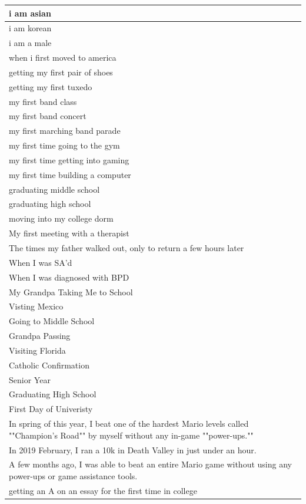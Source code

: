 \documentclass[
  .7em,
  letterpaper,
  DIV=11,
  numbers=noendperiod]{scrartcl}
\begin{document}
\begin{table}
\begin{tabular}{l}
i am asian\\
\hline
i am korean\\
\hline
i am a male\\
\hline
when i first moved to america\\
\hline
getting my first pair of shoes\\
\hline
getting my first tuxedo\\
\hline
my first band class\\
\hline
my first band concert\\
\hline
my first marching band parade\\
\hline
my first time going to the gym\\
\hline
my first time getting into gaming\\
\hline
my first time building a computer\\
\hline
graduating middle school\\
\hline
graduating high school\\
\hline
moving into my college dorm\\
\hline
My first meeting with a therapist\\
\hline
The times my father walked out, only to return a few hours later\\
\hline
When I was SA'd\\
\hline
When I was diagnosed with BPD\\
\hline
My Grandpa Taking Me to School\\
\hline
Visting Mexico\\
\hline
Going to Middle School\\
\hline
Grandpa Passing\\
\hline
Visiting Florida\\
\hline
Catholic Confirmation\\
\hline
Senior Year\\
\hline
Graduating High School\\
\hline
First Day of Univeristy\\
\hline
In spring of this year, I beat one of the hardest Mario levels called ""Champion's Road"" by myself without any in-game ""power-ups.""\\
\hline
In 2019 February, I ran a 10k in Death Valley in just under an hour.\\
\hline
A few months ago, I was able to beat an entire Mario game without using any power-ups or game assistance tools.\\
\hline
getting an A on an essay for the first time in college\\

\end{tabular}
\end{table}
\end{document}

